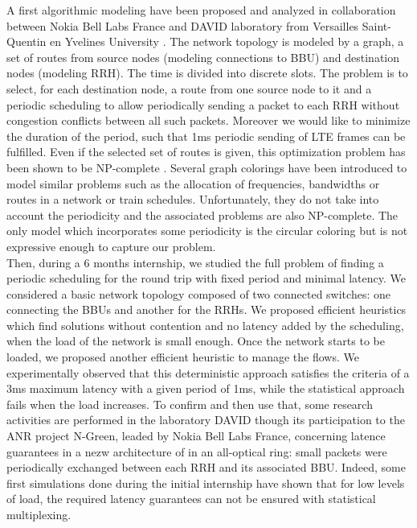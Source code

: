 \documentclass{article}
\begin{document}
A first algorithmic modeling have been proposed and analyzed in collaboration between Nokia Bell Labs France and DAVID laboratory from Versailles Saint-Quentin en Yvelines University \cite{Mael2017}. The network topology is modeled by a graph, a set of routes from source nodes (modeling connections to BBU) and destination nodes (modeling RRH). The time is divided into discrete slots. The problem is to select, for each destination node, a route from one source node to it and a periodic scheduling to allow periodically sending a packet to each RRH without congestion conflicts between all such packets. Moreover we would like to minimize the duration of the period, such that 1ms periodic sending of LTE frames can be fulfilled. Even if the selected set of routes is given, this optimization problem has been shown to be NP-complete \cite{rapportstage}. Several graph colorings have been introduced to model similar problems such as the allocation of frequencies\cite{borndorfer1998frequency}, bandwidths\cite{erlebach2001complexity} or routes\cite{cole1996benefit} in a network or train schedules\cite{strotmann2007railway}. Unfortunately, they do not take into account the periodicity and the associated problems are also NP-complete. The only model which incorporates some periodicity is the circular coloring\cite{zhu2006recent,zhou2013multiple,zhu2001circular} but is not expressive enough to capture our problem.\\

Then, during a 6 months internship, we studied the full problem of finding a periodic scheduling for the round trip with fixed period and minimal latency. We considered a basic network topology composed of two connected switches: one connecting the BBUs and another for the RRHs. We proposed efficient heuristics which find solutions without contention and no latency added by the scheduling, when the load of the network is small enough. Once the network starts to be loaded, we proposed another efficient heuristic to manage the flows. We experimentally observed that this deterministic approach satisfies the criteria of a 3ms maximum latency with a given period of 1ms, while the statistical approach fails when the load increases. To confirm and then use that, some research activities are performed in the laboratory DAVID though its participation to the ANR project N-Green, leaded by Nokia Bell Labs France, concerning latence guarantees in a nezw architecture of in an all-optical ring: small packets were periodically exchanged between each RRH and its associated BBU. Indeed, some first simulations done during the initial internship have shown that for low levels of load, the required latency guarantees can not be ensured with statistical multiplexing.\\
\end{document}
